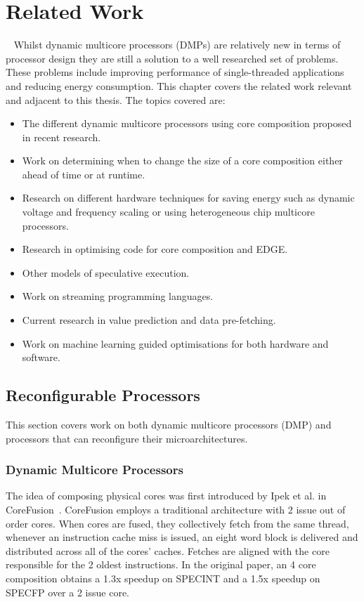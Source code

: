 \chapter{Related Work}~\label{chp:rw}
Whilst dynamic multicore processors (DMPs) are relatively new in terms of processor design they are still a solution to a well researched set of problems.
These problems include improving performance of single-threaded applications and reducing energy consumption.
This chapter covers the related work relevant and adjacent to this thesis.
The topics covered are:
\begin{itemize}
\item The different dynamic multicore processors using core composition proposed in recent research.
\item Work on determining when to change the size of a core composition either ahead of time or at runtime.
\item Research on different hardware techniques for saving energy such as dynamic voltage and frequency scaling or using heterogeneous chip multicore processors.
\item Research in optimising code for core composition and EDGE.
\item Other models of speculative execution.
\item Work on streaming programming languages.
\item Current research in value prediction and data pre-fetching.
\item Work on machine learning guided optimisations for both hardware and software.
\end{itemize}

\section{Reconfigurable Processors}

This section covers work on both dynamic multicore processors (DMP) and processors that can reconfigure their microarchitectures.

\subsection{Dynamic Multicore Processors}
The idea of composing physical cores was first introduced by Ipek et al. in CoreFusion~\cite{ipek2007CoreFusion}.
CoreFusion employs a traditional architecture with 2 issue out of order cores.
When cores are fused, they collectively fetch from the same thread, whenever an instruction cache miss is issued, an eight word block is delivered and distributed across all of the cores' caches.
Fetches are aligned with the core responsible for the 2 oldest instructions.
In the original paper, an 4 core composition obtains a 1.3x speedup on SPECINT and a 1.5x speedup on SPECFP over a 2 issue core.
 
